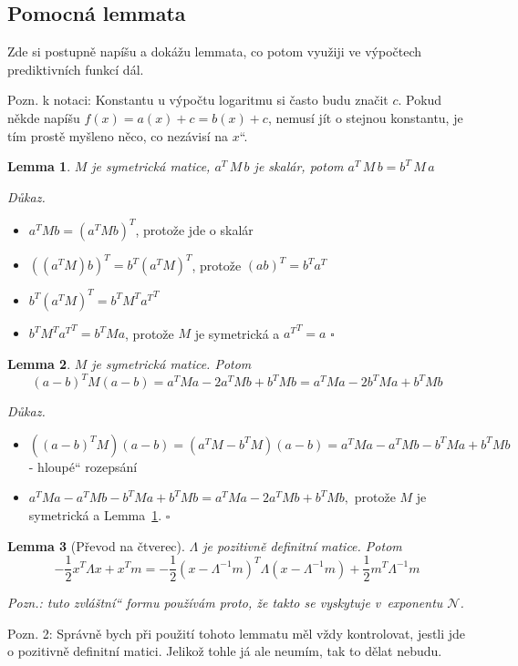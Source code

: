 \documentclass{article}
\newcommand{\uv}[1]{\quotedblbase #1\textquotedblleft}
\newenvironment{pitemize}{
\begin{itemize}
  \setlength{\itemsep}{5pt}
  \setlength{\parskip}{0pt}
  \setlength{\parsep}{0pt}
}{\end{itemize}}
\newenvironment{pproof}{
\noindent\emph{Důkaz.}
\begin{pitemize}
}{\hfill$\square$\end{pitemize}}
\newcommand{\NN}{\mathcal{N}}
\newtheorem{lemma}{Lemma}
\theoremstyle{definition}
\begin{document}
\subsection{Pomocná lemmata}

Zde si postupně napíšu a dokážu lemmata, co potom využiji ve výpočtech prediktivních funkcí dál.

Pozn. k notaci: Konstantu u výpočtu logaritmu si často budu značit $c$. Pokud někde napíšu $f(x)=a(x)+c=b(x)+c$, nemusí jít o stejnou konstantu, je tím prostě myšleno \uv{něco, co nezávisí na $x$}.

\begin{lemma}
\label{prehozy}
$M$ je symetrická matice, $a^T\,M\,b$ je skalár, potom  $a^T\,M\,b= b^T\,M\,a$
\end{lemma}
\begin{pproof}
\item $a^TMb=\left(a^TMb\right)^T$, protože jde o skalár
\item $\left(\left(a^TM\right)b\right)^T=b^T\left(a^TM\right)^T$, protože $(ab)^T=b^Ta^T$
\item $b^T\left(a^TM\right)^T=b^TM^T{a^T}^T$
\item $b^TM^T{a^T}^T=b^TMa$, protože $M$ je symetrická a ${a^T}^T=a$
\end{pproof}

\begin{lemma}
\label{obecny_ctverec}
$M$ je symetrická matice. Potom $$(a-b)^TM(a-b)=a^TMa-2a^TMb+b^TMb=a^TMa-2b^TMa+b^TMb$$
\end{lemma}
\begin{pproof}
\item $\left(\left(a-b\right)^TM\right)(a-b)=\left(a^TM-b^TM\right)(a-b)=a^TMa-a^TMb-b^TMa+b^TMb$ - \uv{hloupé} rozepsání
\item $a^TMa-a^TMb-b^TMa+b^TMb=a^TMa-2a^TMb+b^TMb,$ protože $M$ je symetrická a Lemma~\ref{prehozy}.
\end{pproof}

\begin{lemma}[Převod na čtverec]
\label{ctverec}
$\Lambda$ je pozitivně definitní matice. Potom $$-\frac{1}{2}x^T\Lambda x+x^Tm=-\frac{1}{2}(x-\Lambda^{-1} m)^T\Lambda(x-\Lambda^{-1} m)+\frac{1}{2}m^T\Lambda^{-1} m$$

Pozn.: tuto \uv{zvláštní} formu používám proto, že takto se vyskytuje v~exponentu $\NN$.
\end{lemma}

Pozn. 2: Správně bych při použití tohoto lemmatu měl vždy kontrolovat, jestli jde o pozitivně definitní matici. Jelikož tohle já ale neumím, tak to dělat nebudu.
\end{document}
